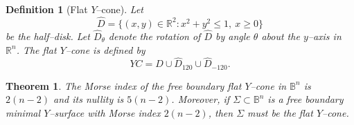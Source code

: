 \documentclass[10pt,a4paper]{amsart}
\newtheorem{theorem}{Theorem}
\newtheorem{definition}{Definition}
\begin{document}
\begin{definition}[Flat $Y$–cone]\label{def:Ycone}
Let
\[
\hat D=\{(x,y)\in\mathbb{R}^2: x^2+y^2\le1,\ x\ge0\}
\]
be the half–disk. Let $\hat D_\theta$ denote the rotation of $\hat D$ by angle $\theta$ about the $y$–axis in $\mathbb{R}^n$.
The \emph{flat $Y$–cone} is defined by
\[
YC=\hat D\cup\hat D_{120}\cup\hat D_{-120}.
\]
\end{definition}

\begin{theorem}\label{thm:main2-n}
The Morse index of the free boundary flat $Y$--cone in $\mathbb{B}^n$ 
is $2(n-2)$ and its nullity is $5(n-2)$. Moreover, if 
$\Sigma \subset \mathbb{B}^n$ is a free boundary minimal $Y$--surface with 
Morse index $2(n-2)$, then $\Sigma$ must be the flat $Y$--cone.
\end{theorem}
\end{document}
